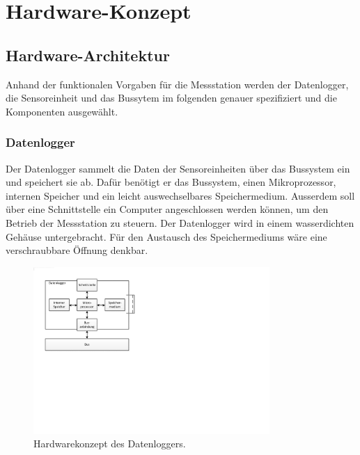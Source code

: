 %
%

\chapter{Hardware-Konzept}\label{chap.hardware}



\section{Hardware-Architektur}\label{sec.hw_arch}

Anhand der funktionalen Vorgaben für die Messstation werden der Datenlogger, die Sensoreinheit und das Bussytem im folgenden genauer spezifiziert und die Komponenten ausgewählt.

\subsection{Datenlogger}
Der Datenlogger sammelt die Daten der Sensoreinheiten über das Bussystem ein und speichert sie ab. Dafür benötigt er das Bussystem, einen Mikroprozessor, internen Speicher und ein leicht auswechselbares Speichermedium. Ausserdem soll über eine Schnittstelle ein Computer angeschlossen werden können, um den Betrieb der Messstation zu steuern. Der Datenlogger wird in einem wasserdichten Gehäuse untergebracht. Für den Austausch des Speichermediums wäre eine verschraubbare Öffnung denkbar.

\begin{figure}[H]
	\centering
		\includegraphics[width=0.8\textwidth]{images/visio/hardwarekonzept_logger.pdf}
	\caption{Hardwarekonzept des Datenloggers.}
	\label{fig.hwkonzept_logger}
\end{figure}

